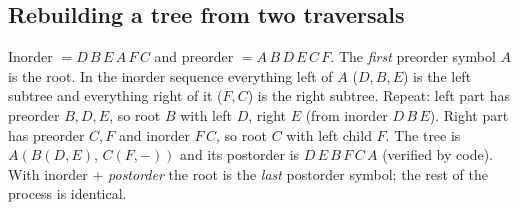 \documentclass[11pt,a4paper]{article}
\begin{document}
\subsection{Rebuilding a tree from two traversals}
\begin{example}
Inorder $=D\,B\,E\,A\,F\,C$ and preorder $=A\,B\,D\,E\,C\,F$. The \emph{first} preorder symbol $A$ is the root. In the inorder sequence everything left of $A$ ($D,B,E$) is the left subtree and everything right of it ($F,C$) is the right subtree. Repeat: left part has preorder $B,D,E$, so root $B$ with left $D$, right $E$ (from inorder $D\,B\,E$). Right part has preorder $C,F$ and inorder $F\,C$, so root $C$ with left child $F$. The tree is $A(B(D,E),\,C(F,-))$ and its postorder is $D\,E\,B\,F\,C\,A$ (verified by code).\\
With inorder + \emph{postorder} the root is the \emph{last} postorder symbol; the rest of the process is identical.
\end{example}
\end{document}
